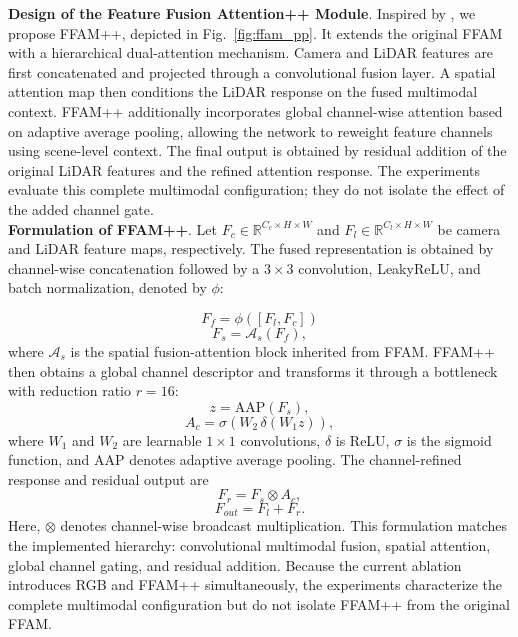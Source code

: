 \textbf{Design of the Feature Fusion Attention++ Module}. Inspired by \cite{Lin2025}, we propose FFAM++, depicted in Fig.~\ref{fig:ffam_pp}. It extends the original FFAM with a hierarchical dual-attention mechanism. Camera and LiDAR features are first concatenated and projected through a convolutional fusion layer. A spatial attention map then conditions the LiDAR response on the fused multimodal context. FFAM++ additionally incorporates global channel-wise attention based on adaptive average pooling, allowing the network to reweight feature channels using scene-level context. The final output is obtained by residual addition of the original LiDAR features and the refined attention response. The experiments evaluate this complete multimodal configuration; they do not isolate the effect of the added channel gate. \\

\textbf{Formulation of FFAM++}. Let $F_c \in \mathbb{R}^{C_c \times H \times W}$ and $F_l \in \mathbb{R}^{C_l \times H \times W}$ be camera and LiDAR feature maps, respectively. The fused representation is obtained by channel-wise concatenation followed by a $3\times3$ convolution, LeakyReLU, and batch normalization, denoted by $\phi$:

\begin{equation}
	F_f = \phi ([F_l, F_c])
	\label{eq:concatenation-image-lidar}
\end{equation}
\begin{equation}
	F_s = \mathcal{A}_{s}(F_f),
\end{equation}
where $\mathcal{A}_{s}$ is the spatial fusion-attention block inherited from FFAM. FFAM++ then obtains a global channel descriptor and transforms it through a bottleneck with reduction ratio $r=16$:
\begin{equation}
	z = \mathrm{AAP}(F_s),
\end{equation}
\begin{equation}
	A_c = \sigma\!\left(W_2\,\delta(W_1 z)\right),
\end{equation}
where $W_1$ and $W_2$ are learnable $1\times1$ convolutions, $\delta$ is ReLU, $\sigma$ is the sigmoid function, and $\mathrm{AAP}$ denotes adaptive average pooling. The channel-refined response and residual output are
\begin{equation}
	F_r = F_s \otimes A_c,
\end{equation}
\begin{equation}
	F_{out} = F_l + F_r.
\end{equation}
Here, $\otimes$ denotes channel-wise broadcast multiplication. This formulation matches the implemented hierarchy: convolutional multimodal fusion, spatial attention, global channel gating, and residual addition. Because the current ablation introduces RGB and FFAM++ simultaneously, the experiments characterize the complete multimodal configuration but do not isolate FFAM++ from the original FFAM.

